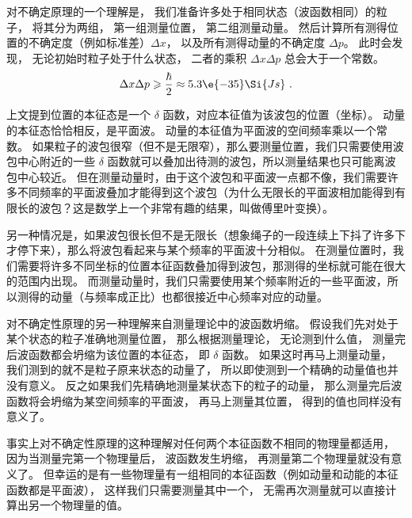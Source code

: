 对不确定原理的一个理解是， 我们准备许多处于相同状态（波函数相同）的粒子， 将其分为两组， 第一组测量位置， 第二组测量动量。 然后计算所有测得位置的不确定度（例如标准差）$\Delta x$， 以及所有测得动量的不确定度 $\Delta p$。 此时会发现， 无论初始时粒子处于什么状态， 二者的乘积 $\Delta x \Delta p$ 总会大于一个常数。
\begin{equation}
\Delta x \Delta p \geqslant \frac{\hbar}{2} \approx 5.3\e{-35} \Si{Js}~.
\end{equation}

上文提到位置的本征态是一个 $\delta$ 函数，对应本征值为该波包的位置（坐标）。 动量的本征态恰恰相反，是平面波。 动量的本征值为平面波的空间频率乘以一个常数。 如果粒子的波包很窄（但不是无限窄），那么要测量位置，我们只需要使用波包中心附近的一些 $\delta$ 函数就可以叠加出待测的波包，所以测量结果也只可能离波包中心较近。 但在测量动量时，由于这个波包和平面波一点都不像，我们需要许多不同频率的平面波叠加才能得到这个波包（为什么无限长的平面波相加能得到有限长的波包？这是数学上一个非常有趣的结果，叫做傅里叶变换）。

另一种情况是，如果波包很长但不是无限长（想象绳子的一段连续上下抖了许多下才停下来），那么将波包看起来与某个频率的平面波十分相似。 在测量位置时，我们需要将许多不同坐标的位置本征函数叠加得到波包，那测得的坐标就可能在很大的范围内出现。 而测量动量时，我们只需要使用某个频率附近的一些平面波，所以测得的动量（与频率成正比）也都很接近中心频率对应的动量。

对不确定性原理的另一种理解来自测量理论中的波函数坍缩。 假设我们先对处于某个状态的粒子准确地测量位置， 那么根据测量理论， 无论测到什么值， 测量完后波函数都会坍缩为该位置的本征态， 即 $\delta$ 函数。 如果这时再马上测量动量， 我们测到的就不是粒子原来状态的动量了， 所以即使测到一个精确的动量值也并没有意义。 反之如果我们先精确地测量某状态下的粒子的动量， 那么测量完后波函数将会坍缩为某空间频率的平面波， 再马上测量其位置， 得到的值也同样没有意义了。

事实上对不确定性原理的这种理解对任何两个本征函数不相同的物理量都适用， 因为当测量完第一个物理量后， 波函数发生坍缩， 再测量第二个物理量就没有意义了。 但幸运的是有一些物理量有一组相同的本征函数（例如动量和动能的本征函数都是平面波）， 这样我们只需要测量其中一个， 无需再次测量就可以直接计算出另一个物理量的值。

